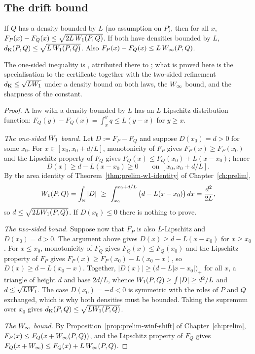 \documentclass[../../../main.tex]{subfiles}
\begin{document}
\subsection{The drift bound}

\begin{proposition}\label{prop:w1}
If $Q$ has a density bounded by $L$ (no assumption on $P$), then for all $x$, $F_P(x)-F_Q(x)\le\sqrt{2L\,W_1(P,Q)}$. If both have densities bounded by $L$, $d_{\mathrm{K}}(P,Q)\le\sqrt{L\,W_1(P,Q)}$. Also $F_P(x)-F_Q(x)\le L\,W_\infty(P,Q)$.
\end{proposition}

The one-sided inequality is \citep[Prop.~1, p.~4]{xu2025}, attributed there to \citet{ross2011}; what is proved here is the specialisation to the certificate together with the two-sided refinement $d_{\mathrm{K}}\le\sqrt{LW_1}$ under a density bound on both laws, the $W_\infty$ bound, and the sharpness of the constant.

\begin{proof}
A law with a density bounded by $L$ has an $L$-Lipschitz distribution function: $F_Q(y)-F_Q(x)=\int_x^yq\le L(y-x)$ for $y\ge x$.

\emph{The one-sided $W_1$ bound.} Let $D:=F_P-F_Q$ and suppose $D(x_0)=d>0$ for some $x_0$. For $x\in[x_0,x_0+d/L]$, monotonicity of $F_P$ gives $F_P(x)\ge F_P(x_0)$ and the Lipschitz property of $F_Q$ gives $F_Q(x)\le F_Q(x_0)+L(x-x_0)$; hence
\[
D(x)\ge d-L(x-x_0)\ge0\qquad\text{on }[x_0,x_0+d/L].
\]
By the area identity of Theorem~\ref{thm:prelim-w1-identity} of Chapter~\ref{ch:prelim},
\[
\Wone(P,Q)=\int_\R|D|\ \ge\ \int_{x_0}^{x_0+d/L}\big(d-L(x-x_0)\big)\,dx=\frac{d^2}{2L},
\]
so $d\le\sqrt{2LW_1(P,Q)}$. If $D(x_0)\le0$ there is nothing to prove.

\emph{The two-sided bound.} Suppose now that $F_P$ is also $L$-Lipschitz and $D(x_0)=d>0$. The argument above gives $D(x)\ge d-L(x-x_0)$ for $x\ge x_0$. For $x\le x_0$, monotonicity of $F_Q$ gives $F_Q(x)\le F_Q(x_0)$ and the Lipschitz property of $F_P$ gives $F_P(x)\ge F_P(x_0)-L(x_0-x)$, so $D(x)\ge d-L(x_0-x)$. Together, $|D(x)|\ge\big(d-L|x-x_0|\big)_+$ for all $x$, a triangle of height $d$ and base $2d/L$, whence $W_1(P,Q)\ge\int|D|\ge d^2/L$ and $d\le\sqrt{LW_1}$. The case $D(x_0)=-d<0$ is symmetric with the roles of $P$ and $Q$ exchanged, which is why both densities must be bounded. Taking the supremum over $x_0$ gives $d_{\mathrm{K}}(P,Q)\le\sqrt{LW_1(P,Q)}$.

\emph{The $W_\infty$ bound.} By Proposition~\ref{prop:prelim-winf-shift} of Chapter~\ref{ch:prelim}, $F_P(x)\le F_Q(x+W_\infty(P,Q))$, and the Lipschitz property of $F_Q$ gives $F_Q(x+W_\infty)\le F_Q(x)+L\,W_\infty(P,Q)$.
\end{proof}
\end{document}

